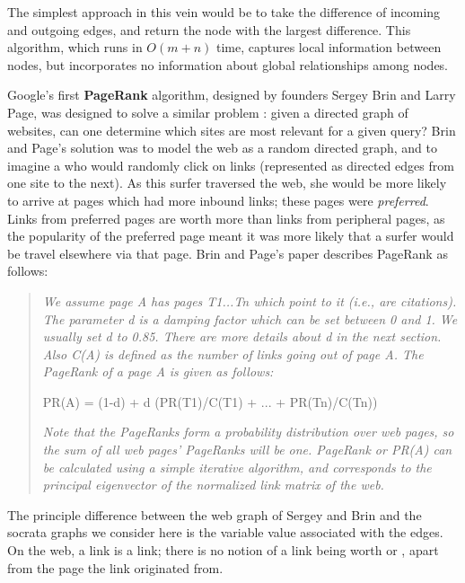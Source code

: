 The simplest approach in this vein would be to take the difference of incoming and outgoing edges, and return the node with the largest difference.
This algorithm, which runs in $O(m + n)$ time, captures local information between nodes, but incorporates no information about global relationships among nodes.

\bigskip

Google's first \textbf{PageRank} algorithm, designed by founders Sergey Brin and Larry Page, was designed to solve a similar problem \cite{brin}: given a directed graph of websites, can one determine which sites are most relevant for a given query?
Brin and Page's solution was to model the web as a random directed graph, and to imagine a  who would randomly click on links (represented as directed edges from one site to the next).
As this surfer traversed the web, she would be more likely to arrive at pages which had more inbound links; these pages were \textit{preferred}.
Links from preferred pages are worth more than links from peripheral pages, as the popularity of the preferred page meant it was more likely that a surfer would be travel elsewhere via that page.
Brin and Page's paper describes PageRank as follows:

\begin{quotation}
	\textit{We assume page A has pages T1...Tn which point to it (i.e., are citations).
	The parameter d is a damping factor which can be set between 0 and 1.
	We usually set d to 0.85.
	There are more details about d in the next section.
	Also C(A) is defined as the number of links going out of page A.
	The PageRank of a page A is given as follows:}
	
	\bigskip
		
	PR(A) = (1-d) + d (PR(T1)/C(T1) + ... + PR(Tn)/C(Tn))
	
	\bigskip
	
	\textit{Note that the PageRanks form a probability distribution over web pages, so the sum of all web pages’ PageRanks will be one.
	PageRank or PR(A) can be calculated using a simple iterative algorithm, and corresponds to the principal eigenvector of the normalized link matrix of the web.}
\end{quotation}

The principle difference between the web graph of Sergey and Brin and the socrata graphs we consider here is the variable value associated with the edges.
On the web, a link is a link; there is no notion of a link being worth  or , apart from the page the link originated from.

